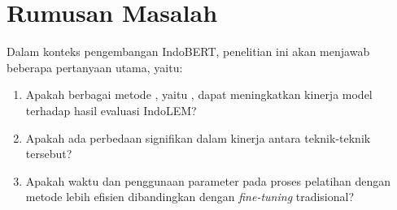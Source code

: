 \section{Rumusan Masalah}

Dalam konteks pengembangan IndoBERT, penelitian ini akan menjawab beberapa pertanyaan utama, yaitu:

\begin{enumerate}
    \item Apakah berbagai metode \PETL, yaitu \methodPETL, dapat meningkatkan kinerja model terhadap hasil evaluasi IndoLEM?
    \item Apakah ada perbedaan signifikan dalam kinerja antara teknik-teknik \PETL tersebut?
    \item Apakah waktu dan penggunaan parameter pada proses pelatihan dengan metode \PETL lebih efisien dibandingkan dengan \textit{fine-tuning} tradisional?
\end{enumerate}
